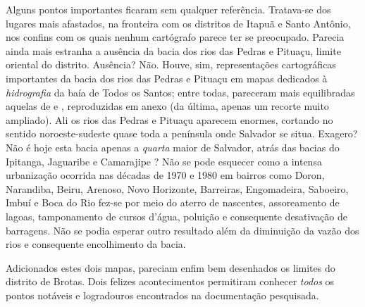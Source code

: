 Alguns pontos importantes ficaram sem qualquer referência. Tratava-se dos lugares mais afastados, na fronteira com os distritos de Itapuã e Santo Antônio, nos confins com os quais nenhum cartógrafo parece ter se preocupado. Parecia ainda mais estranha a ausência da bacia dos rios das Pedras e Pituaçu, limite oriental do distrito. Ausência? Não. Houve, sim, representações cartográficas importantes da bacia dos rios das Pedras e Pituaçu em mapas dedicados à \textit{hidrografia} da baía de Todos os Santos; entre todas, pareceram mais equilibradas aquelas de  e , reproduzidas em anexo (da última, apenas um recorte muito ampliado). Ali os rios das Pedras e Pituaçu aparecem enormes, cortando no sentido noroeste-sudeste quase toda a península onde Salvador se situa. Exagero? Não é hoje esta bacia apenas a \textit{quarta} maior de Salvador, atrás das bacias do Ipitanga, Jaguaribe e Camarajipe \cite{santos_aguas_2010}? Não se pode esquecer como a intensa urbanização ocorrida nas décadas de 1970 e 1980 em bairros como Doron, Narandiba, Beiru, Arenoso, Novo Horizonte, Barreiras, Engomadeira, Saboeiro, Imbuí e Boca do Rio fez-se por meio do aterro de nascentes, assoreamento de lagoas, tamponamento de cursos d'água, poluição e consequente desativação de barragens. Não se podia esperar outro resultado além da diminuição da vazão dos rios e consequente encolhimento da bacia.

Adicionados estes dois mapas, pareciam enfim bem desenhados os limites do distrito de Brotas. Dois felizes acontecimentos permitiram conhecer \textit{todos} os pontos notáveis e logradouros encontrados na documentação pesquisada.

